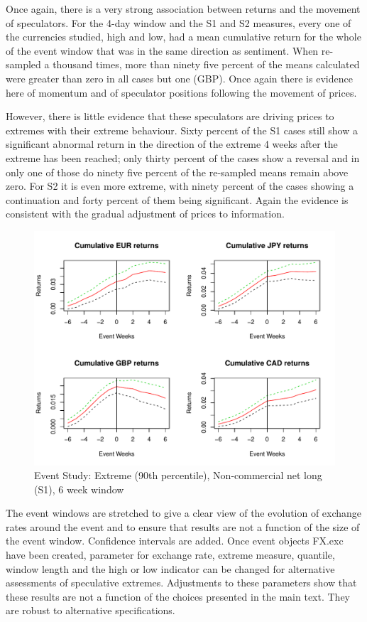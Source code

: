 \documentclass[12pt, a4paper, oneside]{article} %
\begin{document}
Once again, there is a very strong association between returns and the movement of speculators.  For the 4-day window and the S1 and S2 measures, every one of the currencies studied, high and low, had a mean cumulative return for the whole of the event window that was in the same direction as sentiment.  When re-sampled a thousand times, more than ninety five percent of the means calculated were greater than zero in all cases but one (GBP).  Once again there is evidence here of momentum and of speculator positions following the movement of prices.    

However, there is little evidence that these speculators are driving prices to extremes with their extreme behaviour.  Sixty percent of the S1 cases still show a significant abnormal return in the direction of the extreme 4 weeks after the extreme has been reached; only thirty percent of the cases show a reversal and in only one of those do ninety five percent of the re-sampled means remain above zero.  For S2 it is even more extreme, with ninety percent of the cases showing a continuation and forty percent of them being significant.  Again the evidence is consistent with the gradual adjustment of prices to information. 

\begin{figure}[h!]
\graphicspath{{../Figures/}}
\centering
\caption{Event Study:  Extreme (90th percentile), Non-commercial net long (S1), 6 week window}
\label{fig:ES4}
\includegraphics[scale=0.8]{FPCum6wa}
\end{figure}

The event windows are stretched to give a clear view of the evolution of exchange rates  around the event and to ensure that results are not a function of the size of the event window.  Confidence intervals are added.  Once event objects FX.exc have been created, parameter for exchange rate, extreme measure, quantile, window length and the high or low indicator can be changed for alternative assessments of speculative extremes. Adjustments to these parameters show that these results are not a function of the choices presented in the main text.  They are robust to alternative specifications. 
\end{document}
